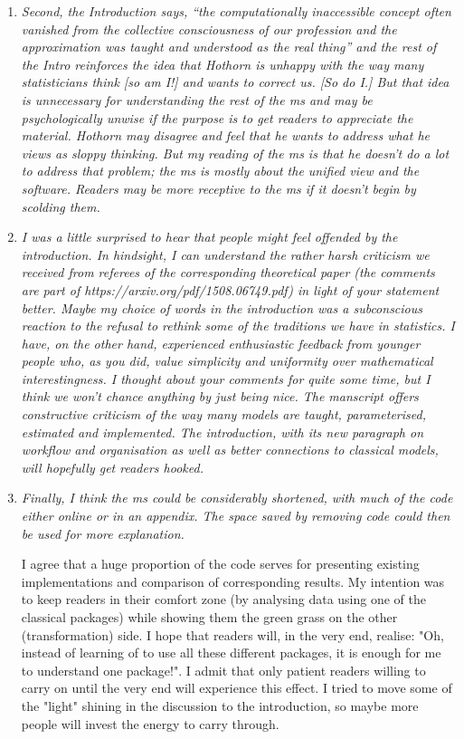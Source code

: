 \documentclass[12pt]{article}
\begin{document}
\begin{enumerate}
\item \textit{Second, the Introduction says, “the computationally inaccessible concept
often vanished from the collective consciousness of our profession and the
approximation was taught and understood as the real thing” and the rest of
the Intro reinforces the idea that Hothorn is unhappy with the way many
statisticians think [so am I!] and wants to correct us.  [So do I.]  But
that idea is unnecessary for understanding the rest of the ms and may be
psychologically unwise if the purpose is to get readers to appreciate the
material.  Hothorn may disagree and feel that he wants to address what he
views as sloppy thinking.  But my reading of the ms is that he doesn’t do a
lot to address that problem; the ms is mostly about the unified view and the
software. Readers may be more receptive to the ms if it doesn’t begin by
scolding them. }

\item \textit{I was a little surprised to hear that people might feel
offended by the introduction. In hindsight, I can understand the rather
harsh criticism we received from referees of the corresponding theoretical
paper (the comments are part of https://arxiv.org/pdf/1508.06749.pdf)
in light of your statement better. Maybe my choice of words in the
introduction was a subconscious reaction to the refusal to rethink some of
the traditions we have in statistics. I have, on the other hand, experienced
enthusiastic feedback from younger people who, as you did, value simplicity
and uniformity over mathematical interestingness. I thought about your
comments for quite some time, but I think we won't chance anything by just
being nice. The manscript offers constructive criticism of the way many
models are taught, parameterised, estimated and implemented. The
introduction, with its new paragraph on workflow and organisation as well as
better connections to classical models, will hopefully get readers
hooked.}

\item \textit{Finally, I think the ms could be considerably shortened,
with much of the code either online or in an appendix.  The space saved by
removing code could then be used for more explanation.  }

I agree that a huge proportion of the code serves for presenting existing
implementations and comparison of corresponding results. My intention was to
keep readers in their comfort zone (by analysing data using one of the
classical packages) while showing them the green grass on the other
(transformation) side. I hope that readers will, in the very end, realise:
"Oh, instead of learning of to use all these different packages, it is
enough for me to understand one package!". I admit that only patient readers
willing to carry on until the very end will experience this effect. I tried
to move some of the "light" shining in the discussion to the introduction,
so maybe more people will invest the energy to carry through.

\end{enumerate}
\end{document}

